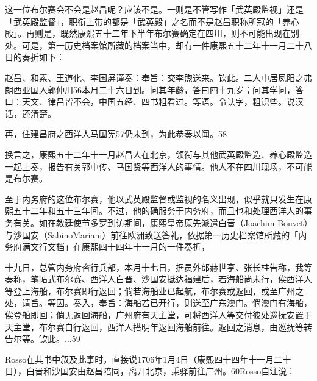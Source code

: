 这一位布尔赛会不会是赵昌呢？应该不是。一则是不管写作「武英殿监视」还是「武英殿监督」，职衔上带的都是「武英殿」之名而不是赵昌职称所冠的「养心殿」。再则是，既然康熙五十二年下半年布尔赛确定在四川，则不可能出现在别处。可是，第一历史档案馆所藏的档案当中，却有一件康熙五十二年十一月二十八日的奏折如下：

\begin{BookQuote}
赵昌、和素、王道化、李国屏谨奏：奉旨：交李煦送来。钦此。二人中居凤阳之弗朗西亚国人郭仲川56本月二十六日到。问其年龄，答曰四十九岁；问其学问，答曰：天文、律吕皆不会，中国五经、四书粗看过。等语。令认字，粗识些。说汉话，还清楚。
\end{BookQuote}

\vfill
\begin{BookNotes}
\end{BookNotes}

\begin{BookQuote}
再，住建昌府之西洋人马国宪57仍未到，为此恭奏以闻。58
\end{BookQuote}

换言之，康熙五十二年十一月赵昌人在北京，领衔与其他武英殿监造、养心殿监造一起上奏，报告有关郭中传、马国贤等西洋人的事情。他人不在四川现场，不可能是布尔赛。

至于内务府的这位布尔赛，他以武英殿监督或监视的名义出现，似乎就只发生在康熙五十二年和五十三年间。不过，他的确服务于内务府，而且也和处理西洋人的事务有关。如在教廷使节多罗到访期间，康熙皇帝原先派遣白晋（Joachim Bouvet）与沙国安（SabinoMariani）前往欧洲致送答礼，依据第一历史档案馆所藏的「内务府满文行文档」在康熙四十四年十一月的一件奏折，

\begin{BookQuote}
十九日，总管内务府咨行兵部，本月十七日，据员外郎赫世亨、张长柱告称，我等奏称，笔帖式布尔赛、西洋人白晋、沙国安抵达福建后，若海船尚未行，俟西洋人等登上海船，布尔赛即行返回；倘若海船业已起航，布尔赛或返回，或至广州之处，请旨。等因。奏入，奉旨：海船若已开行，则送至广东澳门。倘澳门有海船，俟登船即回；倘无返回海船，广州府有天主堂，可将西洋人等交付彼处巡抚安置于天主堂，布尔赛自行返回，西洋人搭明年返回海船前往。返回之消息，由巡抚等转告尔等。钦此。...59
\end{BookQuote}

Rosso在其书中叙及此事时，直接说1706年1月4日（康熙四十四年十一月二十日），白晋和沙国安由赵昌陪同，离开北京，乘驿前往广州。60Rosso自注说：

